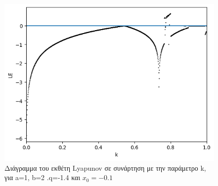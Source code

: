 \begin{figure}[h!]
	\centering
	\includegraphics[width=0.6\linewidth]{LateX images/graphs q14/g9}
	\caption{Διάγραμμα του εκθέτη Lyapunov σε συνάρτηση με την παράμετρο k, για a=1, b=2 .q=-1.4 και \(x_0=-0.1\)}
	\label{f:g26}
\end{figure}

